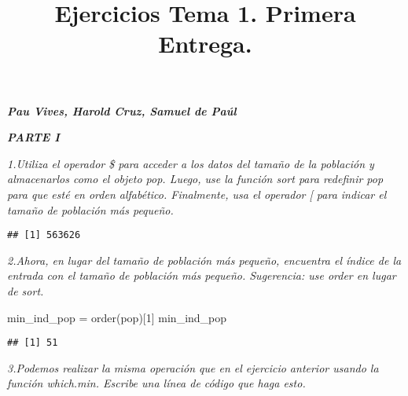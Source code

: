 \documentclass[
]{article}
\title{Ejercicios Tema 1. Primera Entrega.}
\author{}
\date{\vspace{-2.5em}}
\newenvironment{Shaded}{\begin{snugshade}}{\end{snugshade}}
\newcommand{\CommentTok}[1]{\textcolor[rgb]{0.56,0.35,0.01}{\textit{#1}}}
\newcommand{\DecValTok}[1]{\textcolor[rgb]{0.00,0.00,0.81}{#1}}
\newcommand{\FunctionTok}[1]{\textcolor[rgb]{0.00,0.00,0.00}{#1}}
\newcommand{\NormalTok}[1]{#1}
\newcommand{\OtherTok}[1]{\textcolor[rgb]{0.56,0.35,0.01}{#1}}
\newcommand{\SpecialCharTok}[1]{\textcolor[rgb]{0.00,0.00,0.00}{#1}}
\begin{document}
\maketitle

\textbf{\emph{Pau Vives, Harold Cruz, Samuel de Paúl}}

\textbf{\emph{PARTE I}}

\emph{1.Utiliza el operador \$ para acceder a los datos del tamaño de la
población y almacenarlos como el objeto pop. Luego, use la función sort
para redefinir pop para que esté en orden alfabético. Finalmente, usa el
operador {[} para indicar el tamaño de población más pequeño.}

\begin{Shaded}
\end{Shaded}

\begin{verbatim}
## [1] 563626
\end{verbatim}

\emph{2.Ahora, en lugar del tamaño de población más pequeño, encuentra
el índice de la entrada con el tamaño de población más pequeño.
Sugerencia: use order en lugar de sort.}

\begin{Shaded}
\begin{Highlighting}[]
\NormalTok{min\_ind\_pop }\OtherTok{=} \FunctionTok{order}\NormalTok{(pop)[}\DecValTok{1}\NormalTok{]}
\NormalTok{min\_ind\_pop}
\end{Highlighting}
\end{Shaded}

\begin{verbatim}
## [1] 51
\end{verbatim}

\emph{3.Podemos realizar la misma operación que en el ejercicio anterior
usando la función which.min. Escribe una línea de código que haga esto.}
\end{document}
